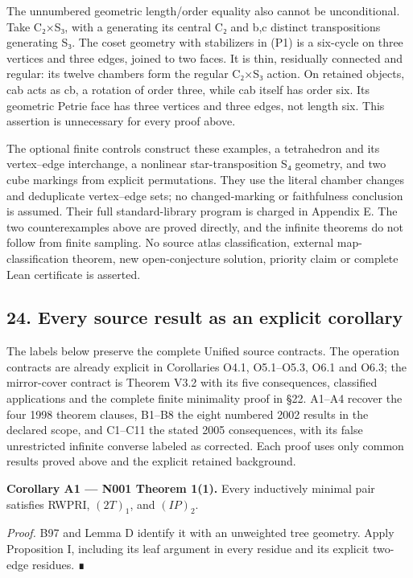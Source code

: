 \documentclass[
  10pt,
  letterpaper,
]{article}
\begin{document}
The unnumbered geometric length/order equality also cannot be
unconditional. Take C₂×S₃, with a generating its central C₂ and b,c
distinct transpositions generating S₃. The coset geometry with
stabilizers in (P1) is a six-cycle on three vertices and three edges,
joined to two faces. It is thin, residually connected and regular: its
twelve chambers form the regular C₂×S₃ action. On retained objects, cab
acts as cb, a rotation of order three, while cab itself has order six.
Its geometric Petrie face has three vertices and three edges, not length
six. This assertion is unnecessary for every proof above.

The optional finite controls construct these examples, a tetrahedron and
its vertex--edge interchange, a nonlinear star-transposition S₄
geometry, and two cube markings from explicit permutations. They use the
literal chamber changes and deduplicate vertex--edge sets; no
changed-marking or faithfulness conclusion is assumed. Their full
standard-library program is charged in Appendix E. The two
counterexamples above are proved directly, and the infinite theorems do
not follow from finite sampling. No source atlas classification,
external map-classification theorem, new open-conjecture solution,
priority claim or complete Lean certificate is asserted.

\subsection{24. Every source result as an explicit
corollary}\label{every-source-result-as-an-explicit-corollary}

The labels below preserve the complete Unified source contracts. The
operation contracts are already explicit in Corollaries O4.1,
O5.1--O5.3, O6.1 and O6.3; the mirror-cover contract is Theorem V3.2
with its five consequences, classified applications and the complete
finite minimality proof in §22. A1--A4 recover the four 1998 theorem
clauses, B1--B8 the eight numbered 2002 results in the declared scope,
and C1--C11 the stated 2005 consequences, with its false unrestricted
infinite converse labeled as corrected. Each proof uses only common
results proved above and the explicit retained background.

\textbf{Corollary A1 --- N001 Theorem 1(1).} Every inductively minimal
pair satisfies RWPRI, \((2T)_1\), and \((IP)_2\).

\emph{Proof.} B97 and Lemma D identify it with an unweighted tree
geometry. Apply Proposition I, including its leaf argument in every
residue and its explicit two-edge residues. ∎
\end{document}
